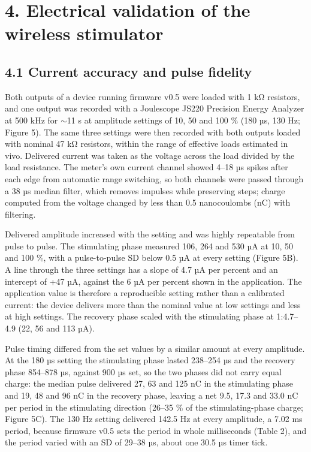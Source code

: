 \section{4. Electrical validation of the wireless stimulator}\label{electrical-validation-of-the-wireless-stimulator}

\subsection{4.1 Current accuracy and pulse fidelity}\label{current-accuracy-and-pulse-fidelity}

Both outputs of a device running firmware v0.5 were loaded with 1 kΩ resistors, and one output was recorded with a Joulescope JS220 Precision Energy Analyzer at 500 kHz for $\sim$11 s at amplitude settings of 10, 50 and 100 \% (180 µs, 130 Hz; Figure 5). The same three settings were then recorded with both outputs loaded with nominal 47 kΩ resistors, within the range of effective loads estimated in vivo. Delivered current was taken as the voltage across the load divided by the load resistance. The meter's own current channel showed 4--18 µs spikes after each edge from automatic range switching, so both channels were passed through a 38 µs median filter, which removes impulses while preserving steps; charge computed from the voltage changed by less than 0.5 nanocoulombs (nC) with filtering.

Delivered amplitude increased with the setting and was highly repeatable from pulse to pulse. The stimulating phase measured 106, 264 and 530 µA at 10, 50 and 100 \%, with a pulse-to-pulse SD below 0.5 µA at every setting (Figure 5B). A line through the three settings has a slope of 4.7 µA per percent and an intercept of +47 µA, against the 6 µA per percent shown in the application. The application value is therefore a reproducible setting rather than a calibrated current: the device delivers more than the nominal value at low settings and less at high settings. The recovery phase scaled with the stimulating phase at 1:4.7--4.9 (22, 56 and 113 µA).

Pulse timing differed from the set values by a similar amount at every amplitude. At the 180 µs setting the stimulating phase lasted 238--254 µs and the recovery phase 854--878 µs, against 900 µs set, so the two phases did not carry equal charge: the median pulse delivered 27, 63 and 125 nC in the stimulating phase and 19, 48 and 96 nC in the recovery phase, leaving a net 9.5, 17.3 and 33.0 nC per period in the stimulating direction (26--35 \% of the stimulating-phase charge; Figure 5C). The 130 Hz setting delivered 142.5 Hz at every amplitude, a 7.02 ms period, because firmware v0.5 sets the period in whole milliseconds (Table 2), and the period varied with an SD of 29--38 µs, about one 30.5 µs timer tick.

